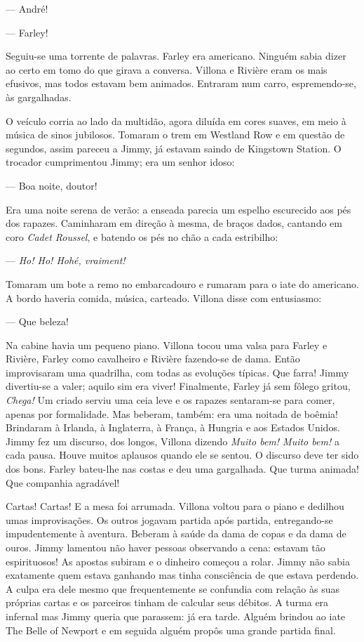 --- André!

--- Farley!

Seguiu-se uma torrente de palavras. Farley era americano. Ninguém
sabia dizer ao certo em tomo do que girava a conversa. Villona e
Rivière eram os mais efusivos, mas todos estavam bem animados.
Entraram num carro, espremendo-se, às gargalhadas.

O veículo corria ao lado da multidão, agora diluída em cores suaves,
em meio à música de sinos jubilosos. Tomaram o trem em Westland Row e
em questão de segundos, assim pareceu a Jimmy, já estavam saindo de
Kingstown Station. O trocador cumprimentou Jimmy; era um senhor
idoso:

--- Boa noite, doutor!

Era uma noite serena de verão: a enseada parecia um espelho escurecido
aos pés dos rapazes. Caminharam em direção à mesma, de braços dados,
cantando em coro \textit{Cadet Roussel}, e batendo os pés no chão a cada
estribilho:

--- \textit{Ho! Ho! Hohé, vraiment!}

Tomaram um bote a remo no embarcadouro e rumaram para o iate do
americano. A bordo haveria comida, música, carteado. Villona disse com
entusiasmo:

--- Que beleza!

Na cabine havia um pequeno piano. Villona tocou uma valsa para Farley
e Rivière, Farley como cavalheiro e Rivière fazendo-se de dama. Então
improvisaram uma quadrilha, com todas as evoluções típicas. Que
farra! Jimmy divertiu-se a valer; aquilo sim era viver! Finalmente,
Farley já sem fôlego gritou, \textit{Chega!} Um criado serviu uma ceia leve e
os rapazes sentaram-se para comer, apenas por formalidade. Mas
beberam, também: era uma noitada de boêmia! Brindaram à Irlanda, à
Inglaterra, à França, à Hungria e aos Estados Unidos. Jimmy fez um
discurso, dos longos, Villona dizendo \textit{Muito bem! Muito bem!} a cada
pausa. Houve muitos aplausos quando ele se sentou. O discurso deve ter
sido dos bons. Farley bateu-lhe nas costas e deu uma gargalhada. Que
turma animada! Que companhia agradável!

Cartas! Cartas! E a mesa foi arrumada. Villona voltou para o piano e
dedilhou umas improvisações. Os outros jogavam partida após partida,
entregando-se impudentemente à aventura. Beberam à saúde da dama de
copas e da dama de ouros. Jimmy lamentou não haver pessoas observando
a cena: estavam tão espirituosos! As apostas subiram e o dinheiro
começou a rolar. Jimmy não sabia exatamente quem estava ganhando mas
tinha consciência de que estava perdendo. A culpa era dele mesmo que
frequentemente se confundia com relação às suas próprias cartas
e os parceiros tinham de calcular seus débitos. A turma era infernal
mas Jimmy queria que parassem: já era tarde. Alguém brindou ao iate
The Belle of Newport e em seguida alguém propôs uma grande partida
final.

